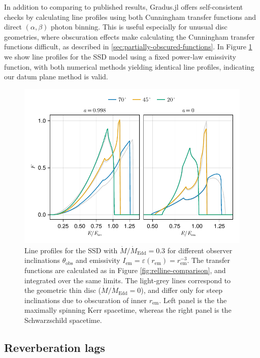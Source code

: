 \documentclass[fleqn,usenatbib]{mnras}
\newcommand{\Gradus}{Gradus.jl }
\begin{document}
In addition to comparing to published results, \Gradus offers self-consistent
checks by calculating line profiles using both Cunningham transfer functions and
direct $(\alpha, \beta)$ photon binning. This is useful especially for unusual
disc geometries, where obscuration effects make calculating the Cunningham
transfer functions difficult, as described in
\ref{sec:partially-obscured-functions}. In Figure \ref{fig:line-profile-ssd} we
show line profiles for the SSD model using a fixed power-law emissivity
function, with both numerical methods yielding identical line profiles,
indicating our datum plane method is valid.

\begin{figure}
	\centering
	\includegraphics[width=0.99\linewidth]{figures/lineprofiles.ssd.pdf}
	\caption{Line profiles for the SSD with $\dot{M} / \dot{M}_\text{Edd} = 0.3$ for different observer inclinations $\theta_\text{obs}$ and emissivity $I_\text{em} = \varepsilon(r_\text{em}) = r_\text{em}^{-3}$. The transfer functions are calculated as in Figure \ref{fig:relline-comparison}, and integrated over the same limits. The light-grey lines correspond to the geometric thin disc ($\dot{M} / \dot{M}_\text{Edd} = 0$), and differ only for steep inclinations due to obscuration of inner $r_\text{em}$. Left panel is the the maximally spinning Kerr spacetime, whereas the right panel is the Schwarzschild spacetime.}
	\label{fig:line-profile-ssd}
\end{figure}


\subsection{Reverberation lags}
\label{sec:lag-transfer-functions}
\end{document}
